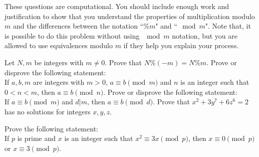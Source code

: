 \documentclass[11pt,addpoints,letterpaper]{exam}
\begin{document}
\vfill





\newpage

\begin{questions}
\question These questions are computational. You should include enough work and justification to show that you understand the properties of multiplication modulo $m$ and the differences between the notation ``$\%m$" and ``$\!\!\!\mod m$". Note that, it is possible to do this problem without using $\mod m$ notation, but you are allowed to use equivalences modulo $m$  if they help you explain your process. 
\newpage
\question[4] Let $N,m$ be integers with $m\ne 0$. Prove that 
$N\%(-m)=N\%m.$
\vfill
\question[4] Prove or disprove the following statement:\\[1em]
If $a,b,m$ are integers with $m>0$, $a\equiv b\pmod m$ and $n$ is an integer such that $0<n<m$, then $a\equiv b\pmod n$. 
\vfill
\question[4] Prove or disprove the following statement:\\[1em]
 If $a\equiv b\pmod{m}$ and $d|m$, then $a\equiv b\pmod d$. 
 \vfill 
 \newpage
 \question[4] Prove that $x^2+3y^7+6z^6 = 2$ has no solutions for integers $x,y,z$. 
 \vfill

\question[4] Prove the following statement: \\[1em]
If $p$ is prime and $x$ is an integer such that $x^2\equiv 3x\pmod{p}$, then $x\equiv 0\pmod{p}$ or $x\equiv 3\pmod{p}$. 
\vfill
    \newpage



   
    \question
\end{questions}
\end{document}
